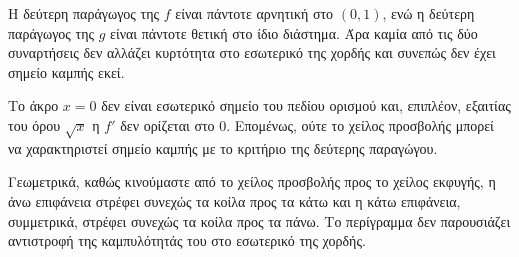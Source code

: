 \begin{alist}
  \item Η δεύτερη παράγωγος της $f$ είναι πάντοτε αρνητική στο $(0,1)$,
        ενώ η δεύτερη παράγωγος της $g$ είναι πάντοτε θετική στο ίδιο
        διάστημα. Άρα καμία από τις δύο συναρτήσεις δεν αλλάζει
        κυρτότητα στο εσωτερικό της χορδής και συνεπώς δεν έχει σημείο
        καμπής εκεί.

        Το άκρο $x=0$ δεν είναι εσωτερικό σημείο του πεδίου ορισμού και,
        επιπλέον, εξαιτίας του όρου $\sqrt{x}$ η $f'$ δεν ορίζεται στο
        $0$. Επομένως, ούτε το χείλος προσβολής μπορεί να χαρακτηριστεί
        σημείο καμπής με το κριτήριο της δεύτερης παραγώγου.

        Γεωμετρικά, καθώς κινούμαστε από το χείλος προσβολής προς το
        χείλος εκφυγής, η άνω επιφάνεια στρέφει συνεχώς τα κοίλα προς τα
        κάτω και η κάτω επιφάνεια, συμμετρικά, στρέφει συνεχώς τα κοίλα
        προς τα πάνω. Το περίγραμμα δεν παρουσιάζει αντιστροφή της
        καμπυλότητάς του στο εσωτερικό της χορδής.
\end{alist}
